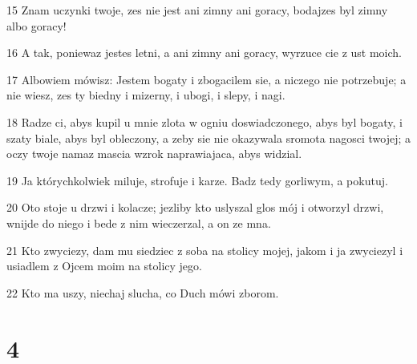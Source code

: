 \par 15 Znam uczynki twoje, zes nie jest ani zimny ani goracy, bodajzes byl zimny albo goracy!
\par 16 A tak, poniewaz jestes letni, a ani zimny ani goracy, wyrzuce cie z ust moich.
\par 17 Albowiem mówisz: Jestem bogaty i zbogacilem sie, a niczego nie potrzebuje; a nie wiesz, zes ty biedny i mizerny, i ubogi, i slepy, i nagi.
\par 18 Radze ci, abys kupil u mnie zlota w ogniu doswiadczonego, abys byl bogaty, i szaty biale, abys byl obleczony, a zeby sie nie okazywala sromota nagosci twojej; a oczy twoje namaz mascia wzrok naprawiajaca, abys widzial.
\par 19 Ja którychkolwiek miluje, strofuje i karze. Badz tedy gorliwym, a pokutuj.
\par 20 Oto stoje u drzwi i kolacze; jezliby kto uslyszal glos mój i otworzyl drzwi, wnijde do niego i bede z nim wieczerzal, a on ze mna.
\par 21 Kto zwyciezy, dam mu siedziec z soba na stolicy mojej, jakom i ja zwyciezyl i usiadlem z Ojcem moim na stolicy jego.
\par 22 Kto ma uszy, niechaj slucha, co Duch mówi zborom.

\chapter{4}

